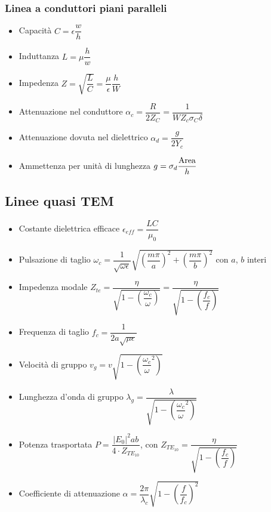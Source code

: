 \documentclass{article}
\begin{document}
\subsubsection{Linea a conduttori piani paralleli}
\begin{itemize}
	\item Capacità \( C = \epsilon \dfrac{w}{h} \)
	\item Induttanza \( L = \mu \dfrac{h}{w} \)
	\item Impedenza \( Z = \sqrt{\dfrac{L}{C}} = \dfrac{\mu}{\epsilon} \dfrac{h}{W} \)
	\item Attenuazione nel conduttore \( \alpha_c = \dfrac{R}{2 Z_C} = \dfrac{1}{W Z_c \sigma_C \delta} \)
	\item Attenuazione dovuta nel dielettrico \( \alpha_d = \dfrac{g}{2 Y_c} \)
	\item Ammettenza per unità di lunghezza \( g = \sigma_d \dfrac{\textnormal{Area}}{h}\)
\end{itemize}

\subsection{Linee quasi TEM}
\begin{itemize}
	\item Costante dielettrica efficace \( \epsilon_{eff} = \dfrac{LC}{\mu_0} \)
\end{itemize}

\begin{itemize}
	\item Pulsazione di taglio \( \omega_c = \dfrac{1}{\sqrt{\omega \epsilon}} \sqrt{\left( \dfrac{m \pi}{a}\right)^2 + \left( \dfrac{m \pi}{b} \right)^2 }\) con \(a\), \(b\) interi
	\item Impedenza modale \( Z_{te} = \dfrac{\eta}{\sqrt{1-\left(\dfrac{\omega_c}{\omega} \right) }} = \dfrac{\eta}{\sqrt{1-\left(\dfrac{f_c}{f} \right) }} \)
	\item Frequenza di taglio \( f_c = \dfrac{1}{2a \sqrt{\mu \epsilon}} \)
	\item Velocità di gruppo \( v_g = v \sqrt{1- \left( \dfrac{\omega_c}{\omega} ^ 2 \right)} \)
	\item Lunghezza d'onda di gruppo \( \lambda_g = \dfrac{\lambda}{\sqrt{1- \left( \dfrac{\omega_c}{\omega} ^ 2 \right)}}\)
	\item Potenza trasportata \( P = \dfrac{|E_0|^2 a b}{4 \cdot Z_{TE_{10}}} \), con \(Z_{TE_{10}} = \dfrac{\eta}{\sqrt{1 - \left( \dfrac{f_c}{f} \right)}} \)
	\item Coefficiente di attenuazione \( \alpha = \dfrac{2 \pi}{\lambda_c} \sqrt{1 - \left( \dfrac{f}{f_c} \right) ^ 2} \)
\end{itemize}
\end{document}
